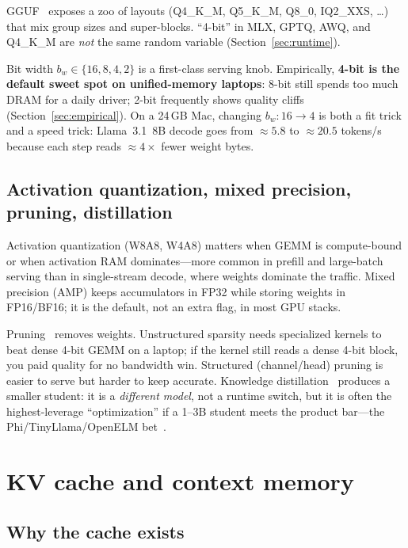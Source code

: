 GGUF~\citep{gguf} exposes a zoo of layouts (Q4\_K\_M, Q5\_K\_M, Q8\_0, IQ2\_XXS, \ldots) that mix group sizes and super-blocks. ``4-bit'' in MLX, GPTQ, AWQ, and Q4\_K\_M are \emph{not} the same random variable (Section~\ref{sec:runtime}).

Bit width \(b_w \in \{16,8,4,2\}\) is a first-class serving knob. Empirically, \textbf{4-bit is the default sweet spot on unified-memory laptops}: 8-bit still spends too much DRAM for a daily driver; 2-bit frequently shows quality cliffs (Section~\ref{sec:empirical}). On a 24\,GB Mac, changing \(b_w:16\to 4\) is both a fit trick and a speed trick: Llama~3.1~8B decode goes from \(\approx 5.8\) to \(\approx 20.5\) tokens/s because each step reads \(\approx 4\times\) fewer weight bytes.

\subsection{Activation quantization, mixed precision, pruning, distillation}

Activation quantization (W8A8, W4A8) matters when GEMM is compute-bound or when activation RAM dominates---more common in prefill and large-batch serving than in single-stream decode, where weights dominate the traffic. Mixed precision (AMP) keeps accumulators in FP32 while storing weights in FP16/BF16; it is the default, not an extra flag, in most GPU stacks.

Pruning~\citep{han2015deep,frantar2023sparsegpt,ma2023llmpruner} removes weights. Unstructured sparsity needs specialized kernels to beat dense 4-bit GEMM on a laptop; if the kernel still reads a dense 4-bit block, you paid quality for no bandwidth win. Structured (channel/head) pruning is easier to serve but harder to keep accurate. Knowledge distillation~\citep{hinton2015distilling,sanh2019distilbert} produces a smaller student: it is a \emph{different model}, not a runtime switch, but it is often the highest-leverage ``optimization'' if a 1--3B student meets the product bar---the Phi/TinyLlama/OpenELM bet~\citep{abdin2024phi3,zhang2024tinyllama,mehta2024openelm}.

\section{KV cache and context memory}
\label{sec:kv}

\subsection{Why the cache exists}

